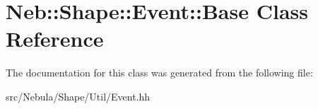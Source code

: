 \hypertarget{classNeb_1_1Shape_1_1Event_1_1Base}{\section{\-Neb\-:\-:\-Shape\-:\-:\-Event\-:\-:\-Base \-Class \-Reference}
\label{classNeb_1_1Shape_1_1Event_1_1Base}
}


\-The documentation for this class was generated from the following file\-:\begin{DoxyCompactItemize}
\item 
src/\-Nebula/\-Shape/\-Util/\-Event.\-hh\end{DoxyCompactItemize}
